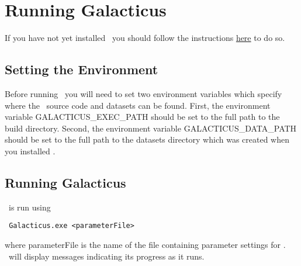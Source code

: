 \chapter{Running Galacticus}

If you have not yet installed \glc\ you should follow the instructions \href{https://github.com/galacticusorg/galacticus/wiki#how-do-i-install-and-use-galacticus}{here} to do so.

\section{Setting the Environment}

Before running \glc\ you will need to set two environment variables which specify where the \glc\ source code and datasets can be found. First, the environment variable {\normalfont \ttfamily GALACTICUS\_EXEC\_PATH} should be set to the full path to the build directory. Second, the environment variable {\normalfont \ttfamily GALACTICUS\_DATA\_PATH} should be set to the full path to the {\normalfont \ttfamily datasets} directory which was created when you installed \glc.

\section{Running Galacticus}

\glc\ is run using
\begin{verbatim}
 Galacticus.exe <parameterFile>
\end{verbatim}
where {\normalfont \ttfamily parameterFile} is the name of the file containing parameter settings for \glc. \glc\ will display messages indicating its progress as it runs.

